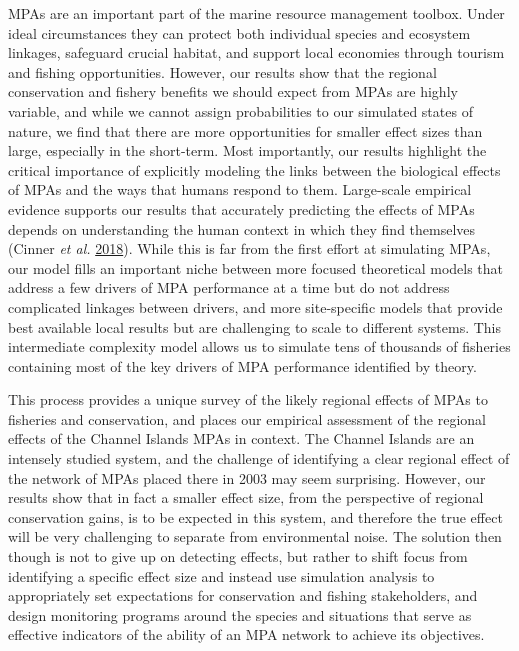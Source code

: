 \documentclass[twoside,12pt,final]{ucthesis-CA2012}
\begin{document}
\begin{ucmainmatter}
MPAs are an important part of the marine resource management toolbox.
Under ideal circumstances they can protect both individual species and
ecosystem linkages, safeguard crucial habitat, and support local
economies through tourism and fishing opportunities. However, our
results show that the regional conservation and fishery benefits we
should expect from MPAs are highly variable, and while we cannot assign
probabilities to our simulated states of nature, we find that there are
more opportunities for smaller effect sizes than large, especially in
the short-term. Most importantly, our results highlight the critical
importance of explicitly modeling the links between the biological
effects of MPAs and the ways that humans respond to them. Large-scale
empirical evidence supports our results that accurately predicting the
effects of MPAs depends on understanding the human context in which they
find themselves (Cinner \emph{et al.}
\protect\hyperlink{ref-Cinner2018}{2018}). While this is far from the
first effort at simulating MPAs, our model fills an important niche
between more focused theoretical models that address a few drivers of
MPA performance at a time but do not address complicated linkages
between drivers, and more site-specific models that provide best
available local results but are challenging to scale to different
systems. This intermediate complexity model allows us to simulate tens
of thousands of fisheries containing most of the key drivers of MPA
performance identified by theory.

This process provides a unique survey of the likely regional effects of
MPAs to fisheries and conservation, and places our empirical assessment
of the regional effects of the Channel Islands MPAs in context. The
Channel Islands are an intensely studied system, and the challenge of
identifying a clear regional effect of the network of MPAs placed there
in 2003 may seem surprising. However, our results show that in fact a
smaller effect size, from the perspective of regional conservation
gains, is to be expected in this system, and therefore the true effect
will be very challenging to separate from environmental noise. The
solution then though is not to give up on detecting effects, but rather
to shift focus from identifying a specific effect size and instead use
simulation analysis to appropriately set expectations for conservation
and fishing stakeholders, and design monitoring programs around the
species and situations that serve as effective indicators of the ability
of an MPA network to achieve its objectives.


\end{ucmainmatter}
\end{document}
